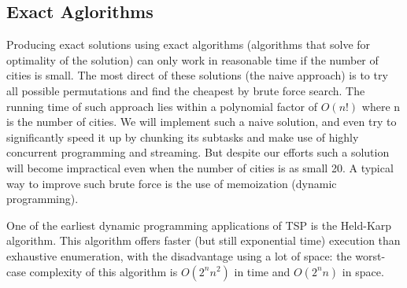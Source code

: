 \documentclass[11pt]{article}
\begin{document}
\subsection{Exact Aglorithms} Producing exact solutions using exact algorithms (algorithms that solve for optimality of the solution) can only work in reasonable time if the number of cities is small. The most direct of these solutions (the naive approach) is to try all possible permutations and find the cheapest by brute force search. The running time of such approach lies within a polynomial factor of $O(n!)$ where n is the number of cities. We will implement such a naive solution, and even try to significantly speed it up by chunking its subtasks and make use of highly concurrent programming and streaming. But despite our efforts such a solution will become impractical even when the number of cities is as small 20. A typical way to improve such brute force is the use of memoization (dynamic programming). \par
 One of the earliest dynamic programming applications of TSP is the Held-Karp algorithm. This algorithm offers faster (but still exponential time) execution than exhaustive enumeration, with the disadvantage using a lot of space: the worst-case complexity of this algorithm is $O(2^n n^2)$ in time and $O(2^n n)$ in space.


\newpage
\end{document}

